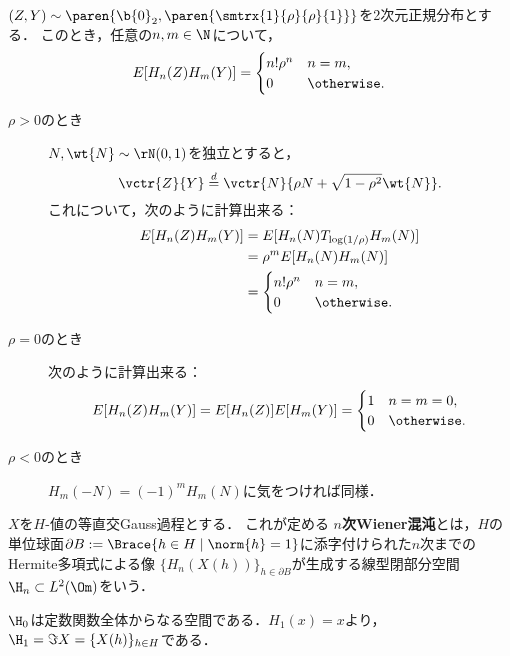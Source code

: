 \documentclass[uplatex,dvipdfmx]{jsreport}
\begin{document}
\begin{proposition}
    $(Z,Y)\sim\paren{\b{0}_2,\paren{\smtrx{1}{\rho}{\rho}{1}}}$を2次元正規分布とする．
    このとき，任意の$n,m\in\N$について，
    \[E[H_n(Z)H_m(Y)]=\begin{cases}
        n!\rho^n&n=m,\\
        0&\otherwise.
    \end{cases}\]
\end{proposition}
\begin{Proof}\mbox{}
    \begin{description}
        \item[$\rho>0$のとき] $N,\wt{N}\sim\rN(0,1)$を独立とすると，
        \[\vctr{Z}{Y}\overset{d}{=}\vctr{N}{\rho N+\sqrt{1-\rho^2}\wt{N}}.\]
        これについて，次のように計算出来る：
        \begin{align*}
            E[H_n(Z)H_m(Y)]&=E[H_n(N)T_{\log(1/\rho)}H_m(N)]\\
            &=\rho^mE[H_n(N)H_m(N)]\\
            &=\begin{cases}
                n!\rho^n&n=m,\\
                0&\otherwise.
            \end{cases}
        \end{align*}
        \item[$\rho=0$のとき] 次のように計算出来る：
        \[E[H_n(Z)H_m(Y)]=E[H_n(Z)]E[H_m(Y)]=\begin{cases}
            1&n=m=0,\\
            0&\otherwise.
        \end{cases}\]
        \item[$\rho<0$のとき] $H_m(-N)=(-1)^mH_m(N)$に気をつければ同様．
    \end{description}
\end{Proof}

\begin{definition}
    $X$を$H$-値の等直交Gauss過程とする．
    これが定める
    \textbf{$n$次Wiener混沌}とは，$H$の単位球面$\partial B:=\Brace{h\in H\mid\norm{h}=1}$に添字付けられた$n$次までのHermite多項式による像
    $\{H_n(X(h))\}_{h\in \partial B}$が生成する線型閉部分空間$\H_n\subset L^2(\Om)$をいう．
\end{definition}

\begin{example}
    $\H_0$は定数関数全体からなる空間である．$H_1(x)=x$より，$\H_1=\Im X=\{X(h)\}_{h\in H}$である．
\end{example}
\end{document}
